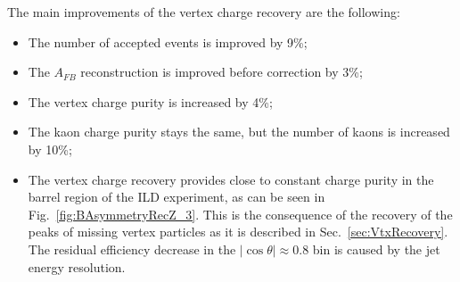 The main improvements of the vertex charge recovery are the following:
\begin{itemize}
	\item The number of accepted events is improved by 9\%;
	\item The $A_{FB}$ reconstruction is improved before correction by 3\%;
	\item The vertex charge purity is increased by 4\%;
	\item The kaon charge purity stays the same, but the number of kaons is increased by 10\%; 
	\item The vertex charge recovery provides close to constant charge purity in the barrel region of the ILD experiment, as can be seen in Fig.~\ref{fig:BAsymmetryRecZ_3}. This is the consequence of the recovery of the peaks of missing vertex particles as it is described in Sec.~\ref{sec:VtxRecovery}.
	The residual efficiency decrease in the $|\cos\theta|\approx 0.8$ bin is caused by the jet energy resolution.  
\end{itemize}

